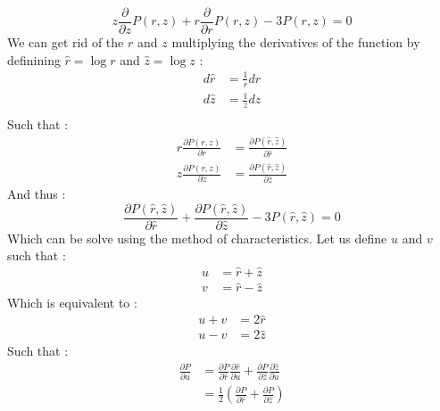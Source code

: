 \documentclass[a4paper,12pt]{article}
\theoremstyle{definition}
\begin{document}
\begin{equation}\label{P:Eq}
	z \frac{\partial}{\partial z}P(r,z)+r \frac{\partial}{\partial r}P(r,z)-3P(r,z)=0
\end{equation}
We can get rid of the $r$ and $z$ multiplying the derivatives of the function by definining $\hat{r}=\log{r}$ and $\hat{z}=\log{z}$ :
\begin{equation}
\begin{split}
	d\hat{r}&=\frac{1}{r}dr\\
	d\hat{z}&=\frac{1}{z}dz\\
\end{split}
\end{equation}
Such that :
\begin{equation}
\begin{split}
	r\frac{\partial P(r,z)}{\partial r}&=\frac{\partial P(\hat r,\hat z)}{\partial \hat{r}}\\
	z\frac{\partial P(r,z)}{\partial z}&=\frac{\partial P(\hat r,\hat z)}{\partial \hat{z}}
\end{split}
\end{equation}
And thus :
\begin{equation}\label{Equ_Hat}
	\frac{\partial P(\hat r,\hat z)}{\partial \hat{r}}+\frac{\partial P(\hat r,\hat z)}{\partial \hat{z}}-3P(\hat r,\hat z)=0
\end{equation}
Which can be solve using the method of characteristics.
Let us define $u$ and $v$ such that :
\begin{equation}
\begin{split}
	u&=\hat r + \hat z\\
	v&=\hat r - \hat z
\end{split}
\end{equation}
Which is equivalent to :
\begin{equation}
\begin{split}
	u+v&=2\hat r\\
	u-v&=2\hat z
\end{split}
\end{equation}
Such that :
\begin{equation}
\begin{split}
	\frac{\partial P}{\partial u}&=\frac{\partial P}{\partial \hat{r}}\frac{\partial \hat r}{\partial u}+\frac{\partial P}{\partial \hat{z}}\frac{\partial \hat z}{\partial u}\\
	&=\frac{1}{2}(\frac{\partial P}{\partial \hat{r}}+\frac{\partial P}{\partial \hat{z}})
\end{split}
\end{equation}
\end{document}
